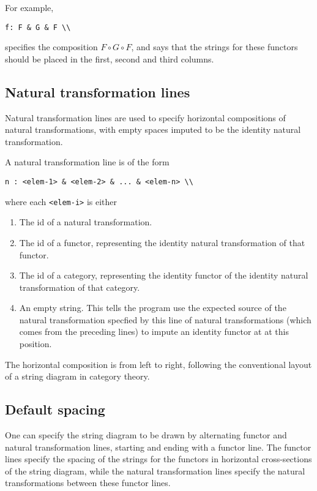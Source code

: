 \documentclass{amsart}
\newcommand{\vlength}{0.2cm}
\begin{document}
    For example,
\vspace\vlength
\begin{verbatim}
f: F & G & F \\
\end{verbatim}
\vspace\vlength
    specifies the composition $F\circ G\circ F$, and says that the strings for 
    these functors should be placed in the first, second and third columns.
\subsection{Natural transformation lines}
    Natural transformation lines are used to specify horizontal compositions of natural transformations,
        with empty spaces imputed to be the identity natural transformation.

    A natural transformation line is of the form
\vspace\vlength
\begin{verbatim}
n : <elem-1> & <elem-2> & ... & <elem-n> \\
\end{verbatim}
\vspace\vlength
    where each \texttt{<elem-i>} is either
    \begin{enumerate}
        \item The id of a natural transformation.
        \item The id of a functor, representing the identity natural transformation of that functor.
        \item The id of a category, representing the identity functor of the identity natural
            transformation of that category.
        \item An empty string. This tells the program use the expected source of the natural
        transformation specfied by this line of natural transformations
        (which comes from the preceding lines) to impute an identity functor at at this position.
    \end{enumerate}
\vspace\vlength
The horizontal composition is from left to right, following the conventional layout of a string diagram
    in category theory.
\subsection{Default spacing}
One can specify the string diagram to be drawn by alternating functor and natural transformation
lines, starting and ending with a functor line.
The functor lines specify the spacing of the strings for the functors in horizontal cross-sections
of the string diagram, while the natural
transformation lines specify the natural transformations between these functor lines.
\end{document}
